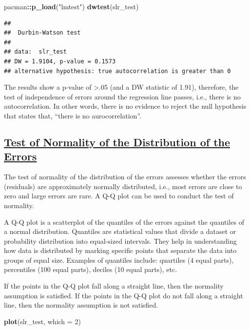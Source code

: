 \documentclass[
]{article}
\newenvironment{Shaded}{\begin{snugshade}}{\end{snugshade}}
\newcommand{\AttributeTok}[1]{\textcolor[rgb]{0.13,0.29,0.53}{#1}}
\newcommand{\DecValTok}[1]{\textcolor[rgb]{0.00,0.00,0.81}{#1}}
\newcommand{\FunctionTok}[1]{\textcolor[rgb]{0.13,0.29,0.53}{\textbf{#1}}}
\newcommand{\NormalTok}[1]{#1}
\newcommand{\SpecialCharTok}[1]{\textcolor[rgb]{0.81,0.36,0.00}{\textbf{#1}}}
\newcommand{\StringTok}[1]{\textcolor[rgb]{0.31,0.60,0.02}{#1}}
\begin{document}
\begin{Shaded}
\begin{Highlighting}[]
\NormalTok{pacman}\SpecialCharTok{::}\FunctionTok{p\_load}\NormalTok{(}\StringTok{"lmtest"}\NormalTok{)}
\FunctionTok{dwtest}\NormalTok{(slr\_test)}
\end{Highlighting}
\end{Shaded}

\begin{verbatim}
## 
##  Durbin-Watson test
## 
## data:  slr_test
## DW = 1.9104, p-value = 0.1573
## alternative hypothesis: true autocorrelation is greater than 0
\end{verbatim}

The results show a p-value of \textgreater.05 (and a DW statistic of
1.91), therefore, the test of independence of errors around the
regression line passes, i.e., there is no autocorrelation. In other
words, there is no evidence to reject the null hypothesis that states
that, ``there is no aurocorrelation''.

\subsection{\texorpdfstring{\ul{\textbf{Test of Normality of the
Distribution of the
Errors}}}{Test of Normality of the Distribution of the Errors}}\label{test-of-normality-of-the-distribution-of-the-errors}

The test of normality of the distribution of the errors assesses whether
the errors (residuals) are approximately normally distributed, i.e.,
most errors are close to zero and large errors are rare. A Q-Q plot can
be used to conduct the test of normality.

A Q-Q plot is a scatterplot of the quantiles of the errors against the
quantiles of a normal distribution. Quantiles are statistical values
that divide a dataset or probability distribution into equal-sized
intervals. They help in understanding how data is distributed by marking
specific points that separate the data into groups of equal size.
Examples of quantiles include: quartiles (4 equal parts), percentiles
(100 equal parts), deciles (10 equal parts), etc.

If the points in the Q-Q plot fall along a straight line, then the
normality assumption is satisfied. If the points in the Q-Q plot do not
fall along a straight line, then the normality assumption is not
satisfied.

\begin{Shaded}
\begin{Highlighting}[]
\FunctionTok{plot}\NormalTok{(slr\_test, }\AttributeTok{which =} \DecValTok{2}\NormalTok{)}
\end{Highlighting}
\end{Shaded}
\end{document}
